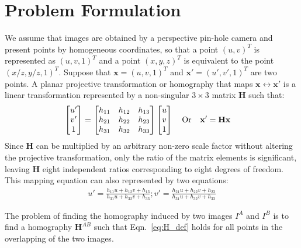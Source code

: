 \documentclass[letterpaper, 10 pt, conference]{ieeeconf}
\newcommand{\bH}{\mathbf{H}}
\begin{document}
 \section{Problem Formulation}
We assume that images are obtained by a perspective pin-hole camera and present 
points by homogeneous coordinates, so that a point $(u, v)^T$ is represented as $(u, v, 1)^T$ and a point $(x, y, z)^T$ is equivalent to the point $(x/z, y/z, 1)^T$. Suppose that $\mathbf{x} = (u, v, 1)^T$ and $\mathbf{x}' = (u', v', 1)^T$  are two points. A planar projective transformation or homography that maps $\mathbf{x} \leftrightarrow \mathbf{x}'$ is a linear transformation represented by a non-singular $3
\times 3$ matrix $\bH$ such that: 
\begin{align}
			\begin{bmatrix}
            u' \\ 
            v'   \\ 
            1  
			\end{bmatrix} 
          & = \begin{bmatrix}
            h_{11} & h_{12} & h_{13} \\ 
            h_{21} & h_{22} & h_{23} \\ 
            h_{31} & h_{32} & h_{33} 
			\end{bmatrix} 
            \begin{bmatrix}
            u \\ 
            v  \\ 
            1  
			\end{bmatrix} \hspace{.1in} \mbox{   Or  } \hspace{.1in} \mathbf{x}' = \mathbf{H} \mathbf{x}   
\label{eq:H_def}
\end{align}
Since $\bH$ can be multiplied by an arbitrary non-zero scale factor without altering the projective transformation, only the ratio of the matrix elements is significant, leaving $\bH$ eight independent ratios corresponding to eight degrees of freedom. This mapping equation can also represented by two equations: 
\begin{align}
 u' = \frac{h_{11}u + h_{12}v + h_{13}}{h_{31}u + h_{32}v + h_{33}} ;  
 v' = \frac{h_{21}u + h_{22}v + h_{23}}{h_{31}u + h_{32}v + h_{33}} 
 \label{eq:close_H}
\end{align}

The problem of finding the homography  induced by two images $I^A$ and $I^B$ is to find a homography $\bH^{AB}$ such that Eqn.~\eqref{eq:H_def} holds for all points in the overlapping of the two images. 
 
\end{document}
